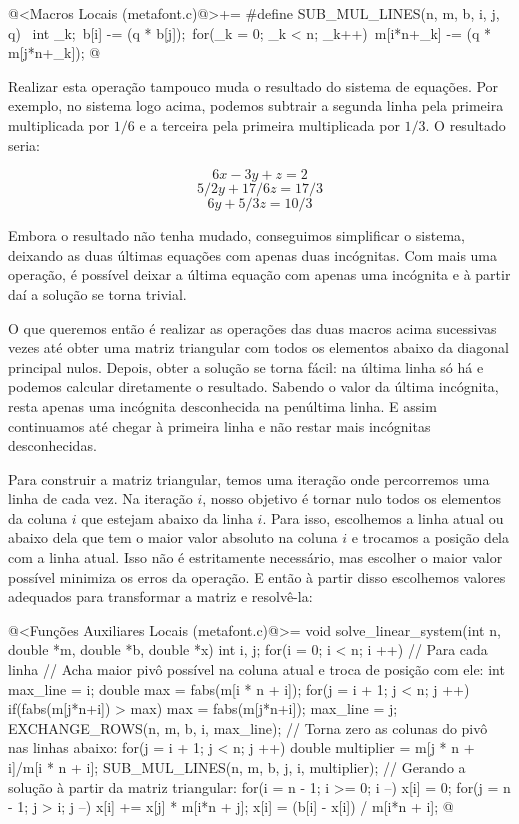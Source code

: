 \iniciocodigo
@<Macros Locais (metafont.c)@>+=
#define SUB_MUL_LINES(n, m, b, i, j, q) {\
  int _k;\
  b[i] -= (q * b[j]);\
  for(_k = 0; _k < n; _k++){\
      m[i*n+_k] -= (q * m[j*n+_k]);}}
@
\fimcodigo

Realizar esta operação tampouco muda o resultado do sistema de
equações. Por exemplo, no sistema logo acima, podemos subtrair a
segunda linha pela primeira multiplicada por $1/6$ e a terceira pela
primeira multiplicada por $1/3$. O resultado seria:

$$
6x-3y+z=2
$$
$$
5/2y+17/6z = 17/3
$$
$$
6y+5/3z=10/3
$$

Embora o resultado não tenha mudado, conseguimos simplificar o sistema,
deixando as duas últimas equações com apenas duas incógnitas. Com mais
uma operação, é possível deixar a última equação com apenas uma
incógnita e à partir daí a solução se torna trivial.

O que queremos então é realizar as operações das duas macros acima
sucessivas vezes até obter uma matriz triangular com todos os
elementos abaixo da diagonal principal nulos. Depois, obter a solução
se torna fácil: na última linha só há e podemos calcular diretamente o
resultado. Sabendo o valor da última incógnita, resta apenas uma
incógnita desconhecida na penúltima linha. E assim continuamos até
chegar à primeira linha e não restar mais incógnitas desconhecidas.

Para construir a matriz triangular, temos uma iteração onde
percorremos uma linha de cada vez. Na iteração $i$, nosso objetivo é
tornar nulo todos os elementos da coluna $i$ que estejam abaixo da
linha $i$. Para isso, escolhemos a linha atual ou abaixo dela que tem
o maior valor absoluto na coluna $i$ e trocamos a posição dela com a
linha atual. Isso não é estritamente necessário, mas escolher o maior
valor possível minimiza os erros da operação. E então à partir disso
escolhemos valores adequados para transformar a matriz e resolvê-la:

\iniciocodigo
@<Funções Auxiliares Locais (metafont.c)@>=
void solve_linear_system(int n, double *m, double *b, double *x){
  int i, j;
  for(i = 0; i < n; i ++){ // Para cada linha
    // Acha maior pivô possível na coluna atual e troca de posição com ele:
    int max_line = i;
    double max = fabs(m[i * n + i]);
    for(j = i + 1; j < n; j ++){
      if(fabs(m[j*n+i]) > max){
        max = fabs(m[j*n+i]);
        max_line = j;
      }
    }
    EXCHANGE_ROWS(n, m, b, i, max_line);
    // Torna zero as colunas do pivô nas linhas abaixo:
    for(j = i + 1; j < n; j ++){
      double multiplier = m[j * n + i]/m[i * n + i];
      SUB_MUL_LINES(n, m, b, j, i, multiplier);
    }
  }
  // Gerando a solução à partir da matriz triangular:
  for(i = n - 1; i >= 0; i --){
    x[i] = 0;
    for(j = n - 1; j > i; j --)
      x[i] += x[j] * m[i*n + j];
    x[i] = (b[i] - x[i]) / m[i*n + i];
  }
}
@
\fimcodigo


